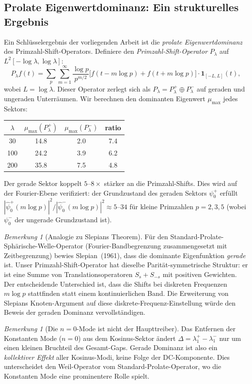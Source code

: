 \documentclass[12pt,a4paper]{article}
\theoremstyle{definition}
\theoremstyle{remark}
\newtheorem{remark}[theorem]{Bemerkung}
\begin{document}
\subsection{Prolate Eigenwertdominanz: Ein strukturelles Ergebnis}

Ein Schlüsselergebnis der vorliegenden Arbeit ist die \emph{prolate Eigenwertdominanz} des Primzahl-Shift-Operators. Definiere den \emph{Primzahl-Shift-Operator} $P_\lambda$ auf $L^2[-\log\lambda, \log\lambda]$:
\[ P_\lambda f(t) = \sum_p \sum_{m=1}^\infty \frac{\log p}{p^{m/2}} \bigl[f(t - m\log p) + f(t + m\log p)\bigr] \cdot \mathbf{1}_{[-L,L]}(t), \]
wobei $L = \log\lambda$. Dieser Operator zerlegt sich als $P_\lambda = P_\lambda^+ \oplus P_\lambda^-$ auf geraden und ungeraden Unterräumen. Wir berechnen den dominanten Eigenwert $\mu_{\max}$ jedes Sektors:

\begin{center}
\begin{tabular}{cccc}
$\lambda$ & $\mu_{\max}(P_\lambda^+)$ & $\mu_{\max}(P_\lambda^-)$ & ratio \\
\hline
30  & 14.8 &  2.0 & 7.4 \\
100 & 24.2 &  3.9 & 6.2 \\
200 & 35.8 &  7.5 & 4.8
\end{tabular}
\end{center}

Der gerade Sektor koppelt $5$--$8\times$ stärker an die Primzahl-Shifts. Dies wird auf der Fourier-Ebene verifiziert: der Grundzustand des geraden Sektors $\psi_0^+$ erfüllt $|\hat\psi_0^+(m\log p)|^2 / |\hat\psi_0^-(m\log p)|^2 \approx 5$--$34$ für kleine Primzahlen $p = 2,3,5$ (wobei $\psi_0^-$ der ungerade Grundzustand ist).

\begin{remark}[Analogie zu Slepians Theorem]
Für den Standard-Prolate-Sphärische-Welle-Operator (Fourier-Bandbegrenzung zusammengesetzt mit Zeitbegrenzung) bewies Slepian~(1961), dass die dominante Eigenfunktion \emph{gerade} ist. Unser Primzahl-Shift-Operator hat dieselbe Parität-symmetrische Struktur: er ist eine Summe von Translationsoperatoren $S_s + S_{-s}$ mit positiven Gewichten. Der entscheidende Unterschied ist, dass die Shifts bei diskreten Frequenzen $m\log p$ stattfinden statt einem kontinuierlichen Band. Die Erweiterung von Slepians Knoten-Argument auf diese diskrete-Frequenz-Einstellung würde den Beweis der geraden Dominanz vervollständigen.
\end{remark}

\begin{remark}[Die $n=0$-Mode ist nicht der Haupttreiber]
Das Entfernen der Konstanten Mode ($n=0$) aus dem Kosinus-Sektor ändert $\Delta = \lambda_1^+ - \lambda_1^-$ nur um einen kleinen Bruchteil des Gesamt-Gaps. Gerade Dominanz ist also ein \emph{kollektiver Effekt} aller Kosinus-Modi, keine Folge der DC-Komponente. Dies unterscheidet den Weil-Operator vom Standard-Prolate-Operator, wo die Konstanten Mode eine prominentere Rolle spielt.
\end{remark}
\end{document}
